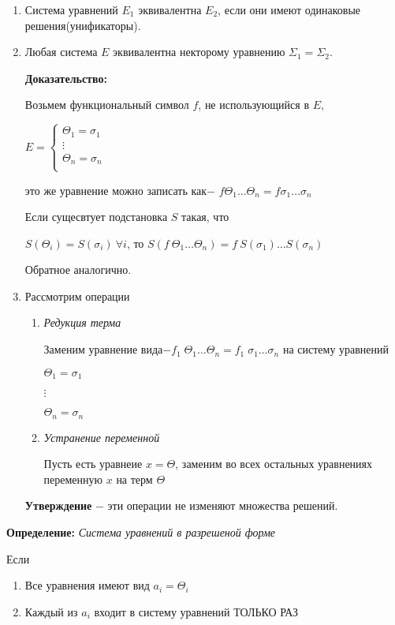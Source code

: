 \documentclass[12pt, a4paper]{article}
\begin{document}
		\begin{enumerate}
			\item Система уравнений $E_1$ эквивалентна $E_2$, если они имеют одинаковые решения(унификаторы).
			\item Любая система $E$ эквивалентна некторому уравнению $\Sigma_1=\Sigma_2$.
					
	\textbf{Доказательство:}\par
		Возьмем функциональный символ $f$, не использующийся в $E$, \par
		$		
		E=\begin{cases}			
			\Theta_1=\sigma_1&\\
			\vdots&\\
			\Theta_n=\sigma_n&\\
		\end{cases}
		$\par
		это же уравнение можно записать как$-$ $f \Theta_1 \hdots \Theta_n=f\sigma_1 \hdots\sigma_n$\par 
		Если сущесвтует подстановка $S$ такая, что\par $S(\Theta_i)=S(\sigma_i)\:\forall i$, 
		то $S(f\:\Theta_1 \hdots \Theta_n)=f\:S(\sigma_1) \hdots S(\sigma_n)$\par Обратное аналогично.
		\item Рассмотрим операции
		\begin{enumerate}
			\item \textit{Редукция терма} \par 
					Заменим уравнение вида$-f_1\;\Theta_1 \hdots\Theta_n=f_1\;\sigma_1\hdots\sigma_n$ на систему уравнений\par$\Theta_1=\sigma_1$\par$\vdots$\par$\Theta_n=\sigma_n$
			\item \textit{Устранение переменной} \par
			Пусть есть уравнеие $x=\Theta$, заменим во всех остальных уравнениях переменную $x$ на терм $\Theta$		
		\end{enumerate}
		\textbf{Утверждение} $-$ эти операции не изменяют множества решений.
	\end{enumerate}	
		\textbf{Определение:} \textit{Система уравнений в разрешеной форме}\par
		Если
			\begin{enumerate}
				\item Все уравнения имеют вид $a_i=\Theta_i$
				\item Каждый из $a_i$ входит в систему уравнений ТОЛЬКО РАЗ
			\end{enumerate}
\end{document}
